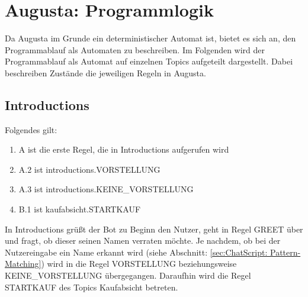 \chapter{Augusta: Programmlogik}
\label{sec:Augusta: Programmlogik}

Da Augusta im Grunde ein deterministischer Automat ist, bietet es sich an, den Programmablauf als Automaten zu beschreiben. Im Folgenden wird der Programmablauf als Automat auf einzelnen Topics aufgeteilt dargestellt. Dabei beschreiben Zustände die jeweiligen Regeln in Augusta. 


\section{Introductions}
\label{sec:Introductions}

Folgendes gilt:

\begin{enumerate}
\item{A ist die erste Regel, die in Introductions aufgerufen wird}
\item{A.2 ist \texttildelow introductions.VORSTELLUNG}
\item{A.3 ist \texttildelow introductions.KEINE\_VORSTELLUNG}
\item{B.1 ist \texttildelow kaufabsicht.STARTKAUF}
\end{enumerate}

In Introductions grüßt der Bot zu Beginn den Nutzer, geht in Regel GREET über und fragt, ob dieser seinen Namen verraten möchte. Je nachdem, ob bei der Nutzereingabe ein Name erkannt wird (siehe Abschnitt: \ref{sec:ChatScript: Pattern-Matching}) wird in die Regel VORSTELLUNG beziehungsweise KEINE\_VORSTELLUNG übergegangen. Daraufhin wird die Regel STARTKAUF des Topics Kaufabsicht betreten. 

